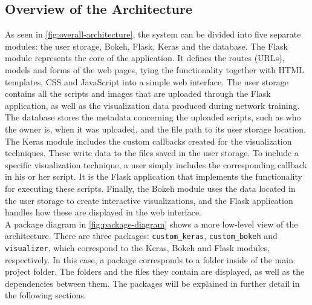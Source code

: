 \subsection{Overview of the Architecture}

As seen in \autoref{fig:overall-architecture}, the system can be divided into five separate modules: the user storage, Bokeh, Flask, Keras and the database. The Flask module represents the core of the application. It defines the routes (URLs), models and forms of the web pages, tying the functionality together with HTML templates, CSS and JavaScript into a simple web interface. The user storage contains all the scripts and images that are uploaded through the Flask application, as well as the visualization data produced during network training. The database stores the metadata concerning the uploaded scripts, such as who the owner is, when it was uploaded, and the file path to its user storage location. The Keras module includes the custom callbacks created for the visualization techniques. These write data to the files saved in the user storage. To include a specific visualization technique, a user simply includes the corresponding callback in his or her script. It is the Flask application that implements the functionality for executing these scripts. Finally, the Bokeh module uses the data located in the user storage to create interactive visualizations, and the Flask application handles how these are displayed in the web interface. \\

\noindent A package diagram in \autoref{fig:package-diagram} shows a more low-level view of the architecture. There are three packages: \texttt{custom\_keras}, \texttt{custom\_bokeh} and \texttt{visualizer}, which correspond to the Keras, Bokeh and Flask modules, respectively. In this case, a package corresponds to a folder inside of the main project folder. The folders and the files they contain are displayed, as well as the dependencies between them. The packages will be explained in further detail in the following sections.



